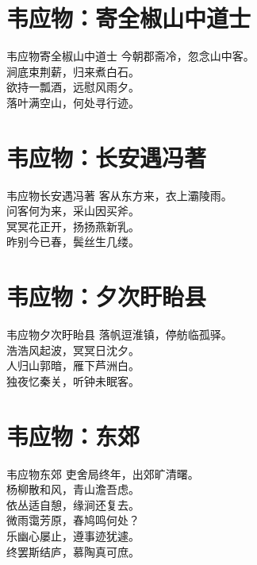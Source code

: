 \documentclass[12pt,oneside,a5paper]{book}
\begin{document}
\chapter{韦应物：寄全椒山中道士}
\begin{poemzh}{韦应物}{寄全椒山中道士}
今朝郡斋冷，忽念山中客。\\
涧底束荆薪，归来煮白石。\\
欲持一瓢酒，远慰风雨夕。\\
落叶满空山，何处寻行迹。\\ 
\end{poemzh}

\chapter{韦应物：长安遇冯著}
\begin{poemzh}{韦应物}{长安遇冯著}
客从东方来，衣上灞陵雨。\\
问客何为来，采山因买斧。\\
冥冥花正开，扬扬燕新乳。\\
昨别今已春，鬓丝生几缕。\\ 
\end{poemzh}

\chapter{韦应物：夕次盱眙县}
\begin{poemzh}{韦应物}{夕次盱眙县}
落帆逗淮镇，停舫临孤驿。\\
浩浩风起波，冥冥日沈夕。\\
人归山郭暗，雁下芦洲白。\\
独夜忆秦关，听钟未眠客。\\ 
\end{poemzh}

\chapter{韦应物：东郊}
\begin{poemzh}{韦应物}{东郊}
吏舍局终年，出郊旷清曙。\\
杨柳散和风，青山澹吾虑。\\
依丛适自憩，缘涧还复去。\\
微雨霭芳原，春鸠鸣何处？\\
乐幽心屡止，遵事迹犹遽。\\
终罢斯结庐，慕陶真可庶。\\ 
\end{poemzh}
\end{document}
